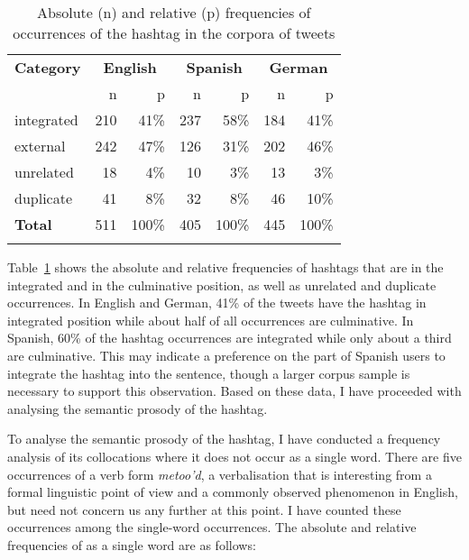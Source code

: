 \documentclass[output=paper,english,spanish,german,english]{langsci/langscibook}
\begin{document}
\begin{table}[b]
\caption{Absolute (n) and relative (p) frequencies of occurrences of the \mt hashtag in the corpora of tweets}\label{freq}
  \begin{tabularx}{\textwidth}{X rr@{\qquad}rr@{\qquad}rr}
    \lsptoprule
    \textbf{Category}    & \multicolumn{2}{c}{\bfseries English} & \multicolumn{2}{c}{\bfseries Spanish} & \multicolumn{2}{c}{\bfseries German}\\
                    & n   & p                     & n   & p                     & n   & p\\
    \midrule
    integrated      & 210 & 41\%                  & 237 & 58\%                  & 184 & 41\%\\
    external        & 242 & 47\%                  & 126 & 31\%                  & 202 & 46\%\\
    unrelated       & 18  & 4\%                   & 10  & 3\%                   & 13  & 3\%\\
    duplicate       & 41  & 8\%                   & 32  & 8\%                   & 46  & 10\%\\
    \midrule
    \textbf{Total}  & 511 & 100\%                 & 405 & 100\%                 & 445 & 100\%\\
    \lspbottomrule
  \end{tabularx}
\end{table}

Table~\ref{freq} shows the absolute and relative frequencies of \mt hashtags that are in the integrated and in the culminative position, as well as unrelated and duplicate occurrences. In English and German, 41\% of the tweets have the hashtag in integrated position while about half of all occurrences are culminative. In Spanish, 60\% of the hashtag occurrences are integrated while only about a third are culminative. This may indicate a preference on the part of Spanish users to integrate the hashtag into the sentence, though a larger corpus sample is necessary to support this observation. Based on these data, I have proceeded with analysing the semantic prosody of the \mt hashtag.


\noindent To analyse the semantic prosody of the \mt hashtag, I have conducted a frequency analysis of its collocations where it does not occur as a single word. There are five occurrences of a verb form \textit{metoo'd}, a verbalisation that is interesting from a formal linguistic point of view and a commonly observed phenomenon in English, but need not concern us any further at this point. I have counted these occurrences among the single-word occurrences. The absolute and relative frequencies of \mt as a single word are as follows:
\end{document}
